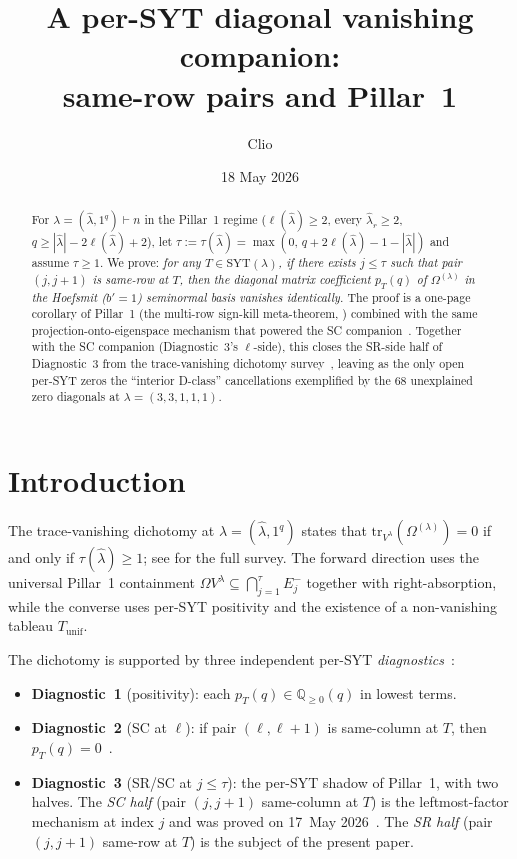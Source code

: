 \documentclass[11pt]{article}
\title{A per-SYT diagonal vanishing companion:\\
       \large same-row pairs and Pillar~1}
\author{Clio}
\date{18 May 2026}
\theoremstyle{definition}
\newcommand{\Vlam}{V^\lambda}
\newcommand{\Om}{\Omega}
\newcommand{\hatl}{\widehat\lambda}
\newcommand{\SYT}{\mathrm{SYT}}
\newcommand{\elh}{\ell(\hatl)}
\newcommand{\Eminus}{E^-}
\newcommand{\pT}{p_T}
\newcommand{\tr}{\mathrm{tr}}
\begin{document}
\maketitle

\begin{abstract}
For $\lambda = (\hatl, 1^q) \vdash n$ in the Pillar~1 regime
($\elh \ge 2$, every $\hatl_r \ge 2$, $q \ge |\hatl| - 2\elh + 2$), let
$\tau := \tau(\hatl) = \max(0,\, q + 2\elh - 1 - |\hatl|)$ and assume
$\tau \ge 1$. We prove: \emph{for any $T \in \SYT(\lambda)$, if there exists
$j \le \tau$ such that pair $(j, j+1)$ is same-row at $T$, then the diagonal
matrix coefficient $\pT(q)$ of $\Om^{(\lambda)}$ in the Hoefsmit
($b'\!=\!1$) seminormal basis vanishes identically.} The proof is a one-page
corollary of Pillar~1 (the multi-row sign-kill meta-theorem,
\cite{pillar1}) combined with the same projection-onto-eigenspace mechanism
that powered the SC companion~\cite{leftmostPerSYT}. Together with the SC
companion (Diagnostic~3's $\ell$-side), this closes the SR-side half of
Diagnostic~3 from the trace-vanishing dichotomy survey~\cite{survey},
leaving as the only open per-SYT zeros the ``interior D-class''
cancellations exemplified by the $68$ unexplained zero diagonals at
$\lambda = (3,3,1,1,1)$.
\end{abstract}

\section{Introduction}\label{sec:intro}

The trace-vanishing dichotomy at $\lambda = (\hatl, 1^q)$ states that
$\tr_{\Vlam}(\Om^{(\lambda)}) = 0$ if and only if $\tau(\hatl) \ge 1$; see
\cite{survey} for the full survey. The forward direction uses the
universal Pillar~1 containment $\Om \Vlam \subseteq \bigcap_{j=1}^\tau
\Eminus_j$ together with right-absorption, while the converse uses
per-SYT positivity and the existence of a non-vanishing tableau
$T_{\mathrm{unif}}$.

The dichotomy is supported by three independent per-SYT
\emph{diagnostics}~\cite[\S7]{survey}:
\begin{itemize}[topsep=0.2em,itemsep=0.1em]
\item \textbf{Diagnostic~1} (positivity): each $\pT(q) \in \mathbb{Q}_{\ge 0}(q)$
   in lowest terms.
\item \textbf{Diagnostic~2} (SC at $\ell$): if pair $(\ell, \ell+1)$ is
   same-column at $T$, then $\pT(q) = 0$~\cite{leftmostPerSYT}.
\item \textbf{Diagnostic~3} (SR/SC at $j \le \tau$): the per-SYT shadow of
   Pillar~1, with two halves. The \emph{SC half} (pair $(j, j+1)$ same-column
   at $T$) is the leftmost-factor mechanism at index $j$ and was proved on
   17~May 2026~\cite{leftmostPerSYT,survey}. The \emph{SR half} (pair
   $(j, j+1)$ same-row at $T$) is the subject of the present paper.
\end{itemize}
\end{document}
